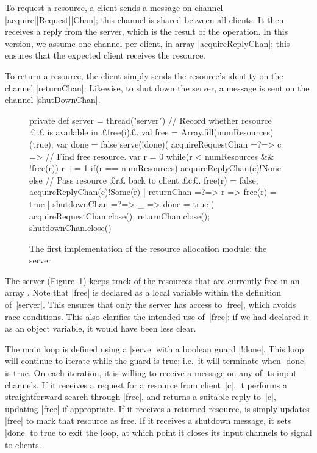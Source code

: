 
To request a resource, a client sends a message on channel
|acquire|\-|Request|\-|Chan|; this channel is shared between all clients.  It
then receives a reply from the server, which is the result of the operation.
In this version, we assume one channel per client, in array
|acquireReplyChan|; this ensures that the expected client receives the
resource.

To return a resource, the client simply sends the resource's identity on the
channel |returnChan|.  Likewise, to shut down the server, a message is sent on
the channel |shutDownChan|.


\begin{figure}
\begin{scala}
  private def server = thread("server"){
    // Record whether resource £i£ is available in £free(i)£.
    val free = Array.fill(numResources)(true); var done = false
    serve(!done)(
      acquireRequestChan =?=> { c => 
	// Find free resource.
	var r = 0
	while(r < numResources && !free(r)) r += 1
	if(r == numResources) acquireReplyChan(c)!None
        else{  // Pass resource £r£ back to client £c£.
	  free(r) = false; acquireReplyChan(c)!Some(r)
        }
      }
      | returnChan =?=> { r => free(r) = true }
      | shutdownChan =?=> { _ => done = true }
    )
    acquireRequestChan.close(); returnChan.close(); shutdownChan.close()
  }
\end{scala}
\caption{The first implementation of the resource allocation module: the
  server}
\label{fig:RAServer1-2}
\end{figure}


The server (Figure~\ref{fig:RAServer1-2}) keeps track of the resources that are
currently free in an array .  Note that |free| is declared as a
local variable within the definition of~|server|.  This ensures that only the
server has access to |free|, which avoids race conditions. This also clarifies
the intended use of~|free|: if we had declared it as an object variable, it
would have been less clear.

The main loop is defined using a |serve| with a boolean guard |!done|.  This
loop will continue to iterate while the guard is true; i.e.~it will terminate
when |done| is true.  On each iteration, it is willing to receive a message on
any of its input channels.  If it receives a request for a resource from
client~|c|, it performs a straightforward search through |free|, and returns a
suitable reply to~|c|, updating |free| if appropriate.  If it receives a
returned resource, is simply updates |free| to mark that resource as free.  If
it receives a shutdown message, it sets |done| to true to exit the loop, at
which point it closes its input channels to signal to clients.

